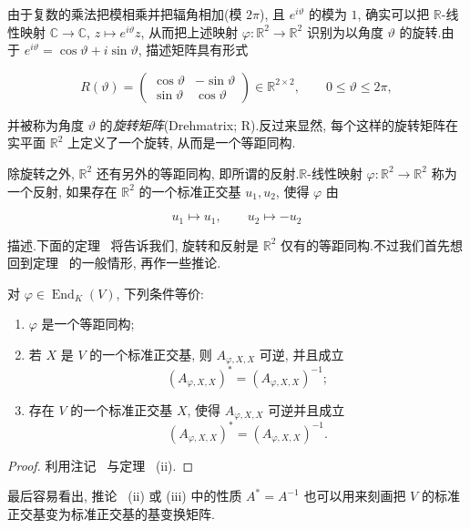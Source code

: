 由于复数的乘法把模相乘并把辐角相加(模 $2\pi$), 且 $e^{i\vartheta}$ 的模为 $1$, 确实可以把 $\mathbb{R}$-线性映射 $\mathbb{C} \longrightarrow \mathbb{C}$, $z \longmapsto e^{i\vartheta} z$, 从而把上述映射 $\varphi \colon \mathbb{R}^2 \longrightarrow \mathbb{R}^2$ 识别为以角度 $\vartheta$ 的旋转.由于 $e^{i\vartheta} = \cos \vartheta + i \sin \vartheta$, 描述矩阵具有形式

\[
R(\vartheta) = \begin{pmatrix} \cos \vartheta & -\sin \vartheta \\ \sin \vartheta & \cos \vartheta \end{pmatrix} \in \mathbb{R}^{2 \times 2}, \qquad 0 \leq \vartheta \leq 2\pi,
\]

并被称为角度 $\vartheta$ 的\emph{旋转矩阵}(\textup{Drehmatrix; R}).反过来显然, 每个这样的旋转矩阵在实平面 $\mathbb{R}^2$ 上定义了一个旋转, 从而是一个等距同构.

除旋转之外, $\mathbb{R}^2$ 还有另外的等距同构, 即所谓的反射.$\mathbb{R}$-线性映射 $\varphi \colon \mathbb{R}^2 \longrightarrow \mathbb{R}^2$ 称为一个反射, 如果存在 $\mathbb{R}^2$ 的一个标准正交基 $u_1, u_2$, 使得 $\varphi$ 由

\[
u_1 \longmapsto u_1, \qquad u_2 \longmapsto -u_2
\]

描述.下面的定理~ 将告诉我们, 旋转和反射是 $\mathbb{R}^2$ 仅有的等距同构.不过我们首先想回到定理~ 的一般情形, 再作一些推论.

\begin{corollary}\label{cor:7.5.3}
对 $\varphi \in \operatorname{End}_K(V)$, 下列条件等价:
\begin{enumerate}
\item[(i)] $\varphi$ 是一个等距同构;
\item[(ii)] 若 $X$ 是 $V$ 的一个标准正交基, 则 $A_{\varphi, X, X}$ 可逆, 并且成立
\[
(A_{\varphi, X, X})^* = (A_{\varphi, X, X})^{-1};
\]
\item[(iii)] 存在 $V$ 的一个标准正交基 $X$, 使得 $A_{\varphi, X, X}$ 可逆并且成立
\[
(A_{\varphi, X, X})^* = (A_{\varphi, X, X})^{-1}\text{.}
\]
\end{enumerate}
\end{corollary}

\begin{proof}
利用注记~ 与定理~ (ii).
\end{proof}

最后容易看出, 推论~ (ii) 或 (iii) 中的性质 $A^* = A^{-1}$ 也可以用来刻画把 $V$ 的标准正交基变为标准正交基的基变换矩阵.

